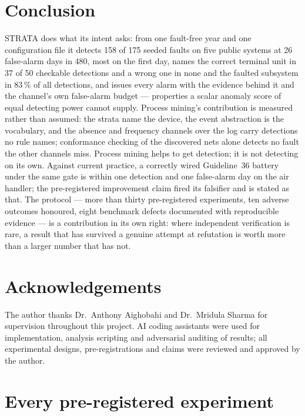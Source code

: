 \documentclass[11pt,letterpaper]{article}
\begin{document}
\section{Conclusion}

STRATA does what its intent asks: from one fault-free year and one configuration file it detects 158 of 175 seeded faults on five public systems at 26 false-alarm days in 480, most on the first day, names the correct terminal unit in 37 of 50 checkable detections and a wrong one in none and the faulted subsystem in 83\,\% of all detections, and issues every alarm with the evidence behind it and the channel's own false-alarm budget --- properties a scalar anomaly score of equal detecting power cannot supply. Process mining's contribution is measured rather than assumed: the strata name the device, the event abstraction is the vocabulary, and the absence and frequency channels over the log carry detections no rule names; conformance checking of the discovered nets alone detects no fault the other channels miss. Process mining helps to get detection; it is not detecting on its own. Against current practice, a correctly wired Guideline~36 battery under the same gate is within one detection and one false-alarm day on the air handler; the pre-registered improvement claim fired its falsifier and is stated as that. The protocol --- more than thirty pre-registered experiments, ten adverse outcomes honoured, eight benchmark defects documented with reproducible evidence --- is a contribution in its own right: where independent verification is rare, a result that has survived a genuine attempt at refutation is worth more than a larger number that has not.

\section*{Acknowledgements}
The author thanks Dr.\ Anthony Aighobahi and Dr.\ Mridula Sharma for supervision throughout this project. AI coding assistants were used for implementation, analysis scripting and adversarial auditing of results; all experimental designs, pre-registrations and claims were reviewed and approved by the author.




\appendix
\section{Every pre-registered experiment}
\label{app:ledger}
\end{document}
